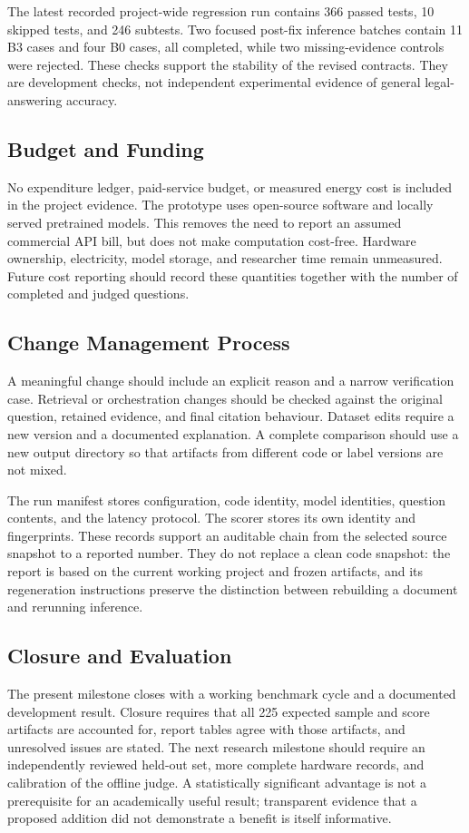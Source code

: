 \documentclass[11pt,a4paper,oneside]{report}
\begin{document}
The latest recorded project-wide regression run contains 366 passed tests, 10 skipped tests, and 246 subtests. Two focused post-fix inference batches contain 11 B3 cases and four B0 cases, all completed, while two missing-evidence controls were rejected. These checks support the stability of the revised contracts. They are development checks, not independent experimental evidence of general legal-answering accuracy.

\subsection{Budget and Funding}
No expenditure ledger, paid-service budget, or measured energy cost is included in the project evidence. The prototype uses open-source software and locally served pretrained models. This removes the need to report an assumed commercial API bill, but does not make computation cost-free. Hardware ownership, electricity, model storage, and researcher time remain unmeasured. Future cost reporting should record these quantities together with the number of completed and judged questions.

\subsection{Change Management Process}
A meaningful change should include an explicit reason and a narrow verification case. Retrieval or orchestration changes should be checked against the original question, retained evidence, and final citation behaviour. Dataset edits require a new version and a documented explanation. A complete comparison should use a new output directory so that artifacts from different code or label versions are not mixed.

The run manifest stores configuration, code identity, model identities, question contents, and the latency protocol. The scorer stores its own identity and fingerprints. These records support an auditable chain from the selected source snapshot to a reported number. They do not replace a clean code snapshot: the report is based on the current working project and frozen artifacts, and its regeneration instructions preserve the distinction between rebuilding a document and rerunning inference.

\subsection{Closure and Evaluation}
The present milestone closes with a working benchmark cycle and a documented development result. Closure requires that all 225 expected sample and score artifacts are accounted for, report tables agree with those artifacts, and unresolved issues are stated. The next research milestone should require an independently reviewed held-out set, more complete hardware records, and calibration of the offline judge. A statistically significant advantage is not a prerequisite for an academically useful result; transparent evidence that a proposed addition did not demonstrate a benefit is itself informative.
\end{document}
